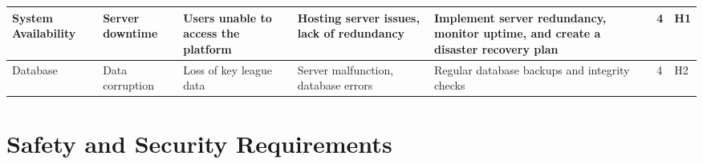 \documentclass{article}
\begin{document}
\begin{landscape}
\begin{table}[hp]
\begin{footnotesize}
\begin{tabular}{|p{1in}|p{1in}|p{1in}|p{1.5in}|p{2.5in}|p{0.2in}|p{0.2in}|}
        System Availability & Server downtime & Users unable to access the platform & Hosting server issues, lack of redundancy & Implement server redundancy, monitor uptime, and create a disaster recovery plan & 4 & H1 \\ 
        \hline

        Database & Data corruption & Loss of key league data & Server malfunction, database errors & Regular database backups and integrity checks & 4 & H2 \\
        \hline

        \bottomrule
    \end{tabular}
    \end{footnotesize}
\end{table}
\end{landscape}
\restoregeometry

\section{Safety and Security Requirements}
\end{document}
